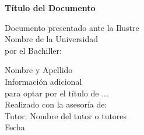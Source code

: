 \begin{titlepage}


\begin{center}

   \vspace*{9.5em}

   \begin{LARGE}
      \bf{
      Título del Documento
      }
   \end{LARGE}

   \vspace*{12em}

   Documento presentado ante la Ilustre\\
   \<Nombre de la Universidad\>\\
   por el Bachiller:\\
   
   \vspace*{1.5em}   

   \vspace*{1em}
   Nombre y Apellido\\
   Información adicional\\


   \vspace*{1.5em}
   para optar por el título de ...\\
   
   \vspace*{2em}
   Realizado con la asesoría de:\\
   \vspace*{0.5em}
   Tutor: Nombre del tutor o tutores\\

   \vspace*{4em}
   Fecha

\end{center}

\end{titlepage}
